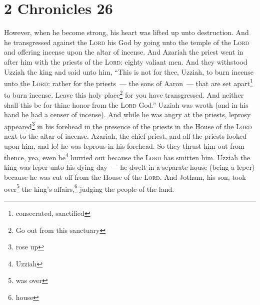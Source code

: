 \section{2 Chronicles 26}\label{2 Chronicles 26}
\begin{enumerate}[align=center]
     However, when he become strong, his heart was lifted up unto destruction. And he transgressed against the \textsc{Lord} his God by going unto the temple of the \textsc{Lord} and offering incense upon the altar of incense.%
     And Azariah the priest went in after him with the priests of the \textsc{Lord}: eighty valiant men.%
     And they withstood Uzziah the king and said unto him, ``This is not for thee, Uzziah, to burn incense unto the \textsc{Lord}; rather for the priests~--- the sons of Aaron~--- that are set apart\footnote{consecrated, sanctified} to burn incense. Leave this holy place\footnote{Go out from this sanctuary} for you have transgressed. And neither shall this be for thine honor from the \textsc{Lord} God.''%
     Uzziah was wroth (and in his hand he had a censer of incense). And while he was angry at the priests, leprosy appeared\footnote{rose up} in his forehead in the presence of the priests in the House of the \textsc{Lord} next to the altar of incense.%
     Azariah, the chief priest, and all the priests looked upon him, and lo! he was leprous in his forehead. So they thrust him out from thence, yea, even he\footnote{Uzziah} hurried out because the \textsc{Lord} has smitten him.%
     Uzziah the king was leper unto his dying day~--- he dwelt in a separate house (being a leper) because he was cut off from the House of the \textsc{Lord}. And Jotham, his son, took over\footnote{was over} the king's affairs,\footnote{house} judging the people of the land.%
\end{enumerate}
